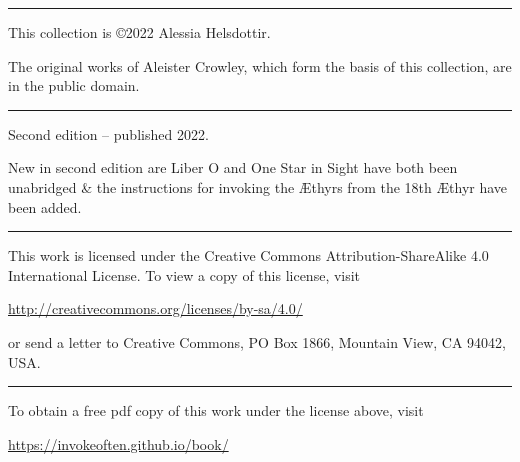 {
\vspace*{\fill}
\begin{center}
  \rule{1in}{0.5pt}
\end{center}

This collection is \copyright 2022 Alessia Helsdottir.

\vspace{\baselineskip}

The original works of Aleister Crowley, which form the basis of this collection, are in the public domain.

\begin{center}
  \rule{1in}{0.5pt}
\end{center}

Second edition -- published 2022. 

New in second edition are Liber O and One Star in Sight have both been unabridged \& the instructions for invoking the \AE{}thyrs from the 18th \AE{}thyr have been added.

\begin{center}
  \rule{1in}{0.5pt}
\end{center}

\begin{center}
\end{center}

This work is licensed under the Creative Commons Attribution-ShareAlike 4.0 International License. To view a copy of this license, visit

\begin{center} \url{http://creativecommons.org/licenses/by-sa/4.0/} \end{center}

or send a letter to Creative Commons, PO Box 1866, Mountain View, CA 94042, USA.

\begin{center}
  \rule{1in}{0.5pt}
\end{center}

To obtain a free pdf copy of this work under the license above, visit

\begin{center}\url{https://invokeoften.github.io/book/}\end{center}

}
